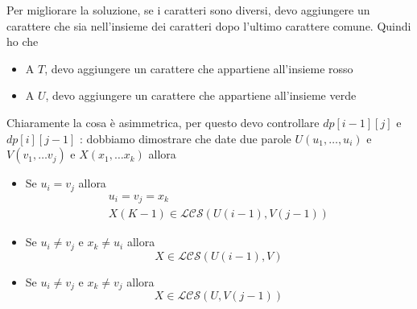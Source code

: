 Per migliorare la soluzione, se i caratteri sono diversi, devo aggiungere un carattere che sia nell'insieme dei caratteri dopo l'ultimo carattere comune. Quindi ho che
\begin{itemize}
	\item A $ T $, devo aggiungere un carattere che appartiene all'insieme rosso
	\item A $ U $, devo aggiungere un carattere che appartiene all'insieme verde
\end{itemize}
Chiaramente la cosa è asimmetrica, per questo devo controllare $ dp\left[i-1\right]\left[j\right] $ e $ dp\left[i\right]\left[j-1\right] $
\vskip3mm
: dobbiamo dimostrare che date due parole $ U \left(u_1,\ldots ,u_i\right) $ e $ V\left(v_1 , \ldots v_j\right) $ e $ X \left(x_1 , \ldots x_k\right) $ allora
\begin{itemize}
	\item Se $ u_i = v_j $  allora
	      \begin{gather*}
		      u_i = v_j = x_k \\
		      X\left(K-1\right) \in \mathcal{LCS}\left(U\left(i-1\right), V\left(j-1\right)\right)
	      \end{gather*}
	\item Se $ u_i \neq v_j $ e $ x_k \neq  u_i $ allora
	      \[
		      X \in \mathcal{LCS}\left(U\left(i-1\right), V \right)
	      \]
	\item Se $ u_i \neq v_j $ e $ x_k \neq  v_j $ allora
	      \[
		      X \in \mathcal{LCS}\left(U, V\left(j-1\right) \right)
	      \]
\end{itemize}

